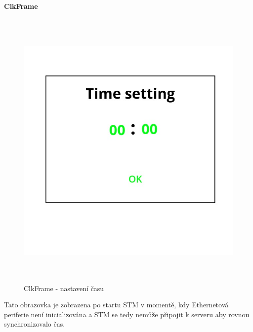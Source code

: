 \paragraph{ClkFrame}
\begin{figure}[H]\centering
\includegraphics[width=140mm, height=140mm]{../img/clk_frame.jpg}
\caption{ClkFrame - nastavení času}
\label{clk-frame}
\end{figure}

Tato obrazovka je zobrazena po startu STM v momentě, kdy Ethernetová periferie není inicializována a
STM se tedy nemůže připojit k serveru aby rovnou synchronizovalo čas.


